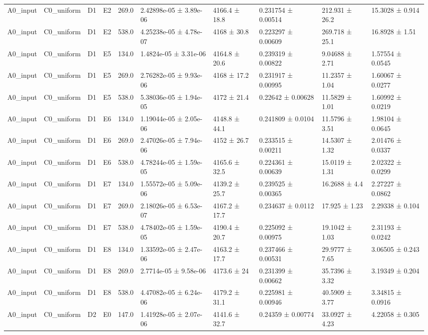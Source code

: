 \begin{table}
\begin{tabular}{llllllllll}
A0\_input & C0\_uniform & D1 & E2 & 269.0 & 2.42898e-05 ± 3.89e-06 & 4166.4 ± 18.8 & 0.231754 ± 0.00514 & 212.931 ± 26.2 & 15.3028 ± 0.914 \\
A0\_input & C0\_uniform & D1 & E2 & 538.0 & 4.25238e-05 ± 4.78e-07 & 4168 ± 30.8 & 0.223297 ± 0.00609 & 269.718 ± 25.1 & 16.8928 ± 1.51 \\
A0\_input & C0\_uniform & D1 & E5 & 134.0 & 1.4824e-05 ± 3.31e-06 & 4164.8 ± 20.6 & 0.239319 ± 0.00822 & 9.04688 ± 2.71 & 1.57554 ± 0.0545 \\
A0\_input & C0\_uniform & D1 & E5 & 269.0 & 2.76282e-05 ± 9.93e-06 & 4168 ± 17.2 & 0.231917 ± 0.00995 & 11.2357 ± 1.04 & 1.60067 ± 0.0277 \\
A0\_input & C0\_uniform & D1 & E5 & 538.0 & 5.38036e-05 ± 1.94e-05 & 4172 ± 21.4 & 0.22642 ± 0.00628 & 11.5829 ± 1.01 & 1.60992 ± 0.0219 \\
A0\_input & C0\_uniform & D1 & E6 & 134.0 & 1.19044e-05 ± 2.05e-06 & 4148.8 ± 44.1 & 0.241809 ± 0.0104 & 11.5796 ± 3.51 & 1.98104 ± 0.0645 \\
A0\_input & C0\_uniform & D1 & E6 & 269.0 & 2.47026e-05 ± 7.94e-06 & 4152 ± 26.7 & 0.233515 ± 0.00211 & 14.5307 ± 1.32 & 2.01476 ± 0.0337 \\
A0\_input & C0\_uniform & D1 & E6 & 538.0 & 4.78244e-05 ± 1.59e-05 & 4165.6 ± 32.5 & 0.224361 ± 0.00639 & 15.0119 ± 1.31 & 2.02322 ± 0.0299 \\
A0\_input & C0\_uniform & D1 & E7 & 134.0 & 1.55572e-05 ± 5.09e-06 & 4139.2 ± 25.7 & 0.239525 ± 0.00365 & 16.2688 ± 4.4 & 2.27227 ± 0.0862 \\
A0\_input & C0\_uniform & D1 & E7 & 269.0 & 2.18026e-05 ± 6.53e-07 & 4167.2 ± 17.7 & 0.234637 ± 0.0112 & 17.925 ± 1.23 & 2.29338 ± 0.104 \\
A0\_input & C0\_uniform & D1 & E7 & 538.0 & 4.78402e-05 ± 1.59e-05 & 4190.4 ± 20.7 & 0.225092 ± 0.00975 & 19.1042 ± 1.03 & 2.31193 ± 0.0242 \\
A0\_input & C0\_uniform & D1 & E8 & 134.0 & 1.33592e-05 ± 2.47e-06 & 4163.2 ± 17.7 & 0.237466 ± 0.00531 & 29.9777 ± 7.65 & 3.06505 ± 0.243 \\
A0\_input & C0\_uniform & D1 & E8 & 269.0 & 2.7714e-05 ± 9.58e-06 & 4173.6 ± 24 & 0.231399 ± 0.00662 & 35.7396 ± 3.32 & 3.19349 ± 0.204 \\
A0\_input & C0\_uniform & D1 & E8 & 538.0 & 4.47082e-05 ± 6.24e-06 & 4179.2 ± 31.1 & 0.225981 ± 0.00946 & 40.5909 ± 3.77 & 3.34815 ± 0.0916 \\
A0\_input & C0\_uniform & D2 & E0 & 147.0 & 1.41928e-05 ± 2.07e-06 & 4141.6 ± 32.7 & 0.24359 ± 0.00774 & 33.0927 ± 4.23 & 4.22058 ± 0.305 \\

\end{tabular}
\end{table}
